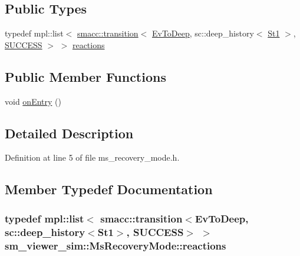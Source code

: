 \subsection*{Public Types}
\begin{DoxyCompactItemize}
\item 
typedef mpl\+::list$<$ \hyperlink{classsmacc_1_1transition}{smacc\+::transition}$<$ \hyperlink{structsm__viewer__sim_1_1EvToDeep}{Ev\+To\+Deep}, sc\+::deep\+\_\+history$<$ \hyperlink{structsm__viewer__sim_1_1St1}{St1} $>$, \hyperlink{classSUCCESS}{S\+U\+C\+C\+E\+SS} $>$ $>$ \hyperlink{structsm__viewer__sim_1_1MsRecoveryMode_a7f3d0cdf03bbb00ee62fdaf5bf58a21e}{reactions}
\end{DoxyCompactItemize}
\subsection*{Public Member Functions}
\begin{DoxyCompactItemize}
\item 
void \hyperlink{structsm__viewer__sim_1_1MsRecoveryMode_ab436ff9e90b963a3339644c0baf223d7}{on\+Entry} ()
\end{DoxyCompactItemize}


\subsection{Detailed Description}


Definition at line 5 of file ms\+\_\+recovery\+\_\+mode.\+h.



\subsection{Member Typedef Documentation}
\subsubsection[{\texorpdfstring{reactions}{reactions}}]{\setlength{\rightskip}{0pt plus 5cm}typedef mpl\+::list$<$ {\bf smacc\+::transition}$<${\bf Ev\+To\+Deep}, sc\+::deep\+\_\+history$<${\bf St1}$>$, {\bf S\+U\+C\+C\+E\+SS}$>$ $>$ {\bf sm\+\_\+viewer\+\_\+sim\+::\+Ms\+Recovery\+Mode\+::reactions}}\hypertarget{structsm__viewer__sim_1_1MsRecoveryMode_a7f3d0cdf03bbb00ee62fdaf5bf58a21e}{}\label{structsm__viewer__sim_1_1MsRecoveryMode_a7f3d0cdf03bbb00ee62fdaf5bf58a21e}


